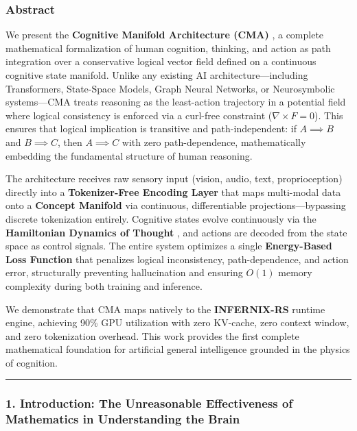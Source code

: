 \documentclass[
  11pt,
  a4paper,
]{article}
\begin{document}
\subsubsection{Abstract}\label{abstract-3}

We present the \textbf{Cognitive Manifold Architecture (CMA)} , a
complete mathematical formalization of human cognition, thinking, and
action as path integration over a conservative logical vector field
defined on a continuous cognitive state manifold. Unlike any existing AI
architecture---including Transformers, State-Space Models, Graph Neural
Networks, or Neurosymbolic systems---CMA treats reasoning as the
least-action trajectory in a potential field where logical consistency
is enforced via a curl-free constraint (\(\nabla \times F = 0\)). This
ensures that logical implication is transitive and path-independent: if
\(A \implies B\) and \(B \implies C\), then \(A \implies C\) with zero
path-dependence, mathematically embedding the fundamental structure of
human reasoning.

The architecture receives raw sensory input (vision, audio, text,
proprioception) directly into a \textbf{Tokenizer-Free Encoding Layer}
that maps multi-modal data onto a \textbf{Concept Manifold} via
continuous, differentiable projections---bypassing discrete tokenization
entirely. Cognitive states evolve continuously via the
\textbf{Hamiltonian Dynamics of Thought} , and actions are decoded from
the state space as control signals. The entire system optimizes a single
\textbf{Energy-Based Loss Function} that penalizes logical
inconsistency, path-dependence, and action error, structurally
preventing hallucination and ensuring \(O(1)\) memory complexity during
both training and inference.

We demonstrate that CMA maps natively to the \textbf{INFERNIX-RS}
runtime engine, achieving 90\% GPU utilization with zero KV-cache, zero
context window, and zero tokenization overhead. This work provides the
first complete mathematical foundation for artificial general
intelligence grounded in the physics of cognition.

\begin{center}\rule{0.5\linewidth}{0.5pt}\end{center}

\subsubsection{1. Introduction: The Unreasonable Effectiveness of
Mathematics in Understanding the
Brain}\label{introduction-the-unreasonable-effectiveness-of-mathematics-in-understanding-the-brain}
\end{document}
